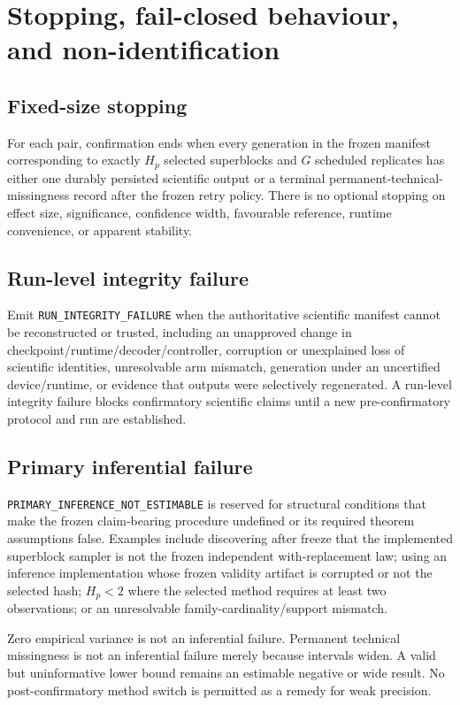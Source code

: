 \documentclass[11pt,a4paper]{article}
\newcommand{\INFERNE}{\texttt{PRIMARY\_INFERENCE\_NOT\_\allowbreak ESTIMABLE}}
\newcommand{\RUNFAIL}{\nolinkurl{RUN_INTEGRITY_FAILURE}}
\begin{document}
\section{Stopping, fail-closed behaviour, and non-identification}\label{sec:failclosed}

\subsection{Fixed-size stopping}
For each pair, confirmation ends when every generation in the frozen manifest corresponding to exactly $H_p$ selected superblocks and $G$ scheduled replicates has either one durably persisted scientific output or a terminal permanent-technical-missingness record after the frozen retry policy. There is no optional stopping on effect size, significance, confidence width, favourable reference, runtime convenience, or apparent stability.

\subsection{Run-level integrity failure}
Emit \RUNFAIL{} when the authoritative scientific manifest cannot be reconstructed or trusted, including an unapproved change in checkpoint/runtime/decoder/controller, corruption or unexplained loss of scientific identities, unresolvable arm mismatch, generation under an uncertified device/runtime, or evidence that outputs were selectively regenerated. A run-level integrity failure blocks confirmatory scientific claims until a new pre-confirmatory protocol and run are established.

\subsection{Primary inferential failure}
\INFERNE{} is reserved for structural conditions that make the frozen claim-bearing procedure undefined or its required theorem assumptions false. Examples include discovering after freeze that the implemented superblock sampler is not the frozen independent with-replacement law; using an inference implementation whose frozen validity artifact is corrupted or not the selected hash; $H_p<2$ where the selected method requires at least two observations; or an unresolvable family-cardinality/support mismatch.

Zero empirical variance is not an inferential failure. Permanent technical missingness is not an inferential failure merely because intervals widen. A valid but uninformative lower bound remains an estimable negative or wide result. No post-confirmatory method switch is permitted as a remedy for weak precision.
\end{document}

